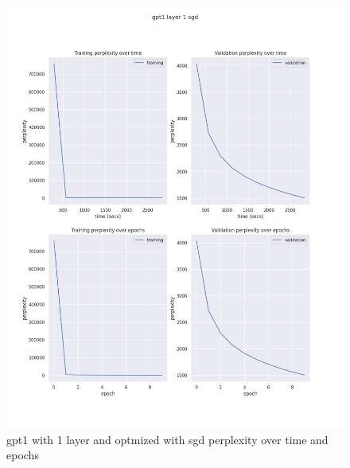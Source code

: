 \documentclass[12pt]{article}
\theoremstyle{definition}
\begin{document}
\begin{figure}[H]
     \centering
     \includegraphics[scale=0.4]{gpt1_layer_1_sgd.png}
     \caption{gpt1 with 1 layer and optmized with sgd perplexity over time and epochs}
\end{figure}
\end{document}
